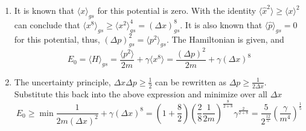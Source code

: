 \begin{sol}
\begin{enumerate}[label=\textbf{(\alph*)}]
\item
It is known that $\langle x\rangle_{gs}$ for this potential is zero. With the identity $\langle \hat x^2\rangle\geq\langle x\rangle^2$ can conclude that $\langle x^8\rangle_{gs}\geq\langle x^2\rangle^4_{gs}=(\Delta x)^8_{gs}$. It is also known that $\langle\hat p\rangle_{gs}=0$ for this potential, thus, $(\Delta p)_{gs}^2=\langle p^2\rangle_{gs}$. The Hamiltonian is given, and 
$$E_0=\langle H\rangle_{gs}=\frac{\langle p^2\rangle}{2m}+\gamma\langle x^8\rangle=\frac{(\Delta p)^2}{2m}+\gamma(\Delta x)^8$$
\item
The uncertainty principle, $\Delta x\Delta p\geq\frac{1}{2}$ can be rewritten as $\Delta p\geq\frac{1}{2\Delta x}$. Substitute this back into the above expression and minimize over all $\Delta x$
$$E_0\geq\min\frac{1}{2m(\Delta x)^2}+\gamma(\Delta x)^8=\left(1+\frac{8}{2}\right)\left(\frac{2}{8}\frac{1}{2m}\right)^\frac{8}{2+8}\gamma^\frac{2}{2+8}=\frac{5}{2^\frac{12}{5}}\left(\frac{\gamma}{m^4}\right)^\frac{1}{5}$$
\end{enumerate}
\end{sol}